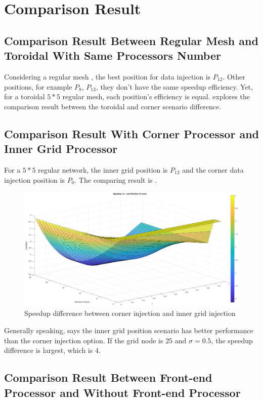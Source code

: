 \section{Comparison Result}
\subsection{Comparison Result Between Regular Mesh and Toroidal With Same Processors Number}
Considering a regular mesh , the best position for data injection is $P_{12}$.   Other positions, for example $P_{8}$, $P_{13}$, they don't have the same speedup efficiency.   Yet, for a toroidal $5*5$ regular mesh, each position's efficiency is equal.   explores the comparison result between the toroidal and corner scenario difference. 

\subsection{Comparison Result With Corner Processor and Inner Grid Processor}
For a $5*5$ regular network, the inner grid position is $P_{12}$ and the corner data injection position is $P_{0}$.  
The comparing result is .  

\begin{figure}[!ht]
\centering
\includegraphics[width=1\columnwidth]{figure/sacom5t5ci.eps}
\caption{ Speedup difference between corner injection and inner grid injection}
\label{fig:sacom5t5ci}
\end{figure}

Generally speaking,  says the inner grid position scenario has better performance than the corner injection option.   If the grid node is $25$ and $\sigma = 0.5$, the speedup difference is largest, which is $4$.  
\newpage

\subsection{Comparison Result Between Front-end Processor and Without Front-end Processor}

